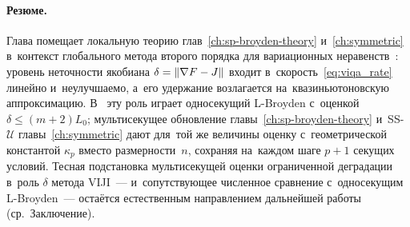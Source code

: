 \paragraph{Резюме.}\label{par:viqa-summary}
Глава помещает локальную теорию глав~\ref{ch:sp-broyden-theory}
и~\ref{ch:symmetric} в~контекст глобального метода второго порядка для
вариационных неравенств~\cite{viqa2024}: уровень неточности якобиана
$\delta=\left\|\nabla F - J\right\|$ входит в~скорость~\eqref{eq:viqa_rate}
линейно и~неулучшаемо, а~его удержание возлагается на~квазиньютоновскую
аппроксимацию. В~\cite{viqa2024} эту роль играет односекущий L-Broyden
с~оценкой $\delta\le(m{+}2)L_0$; мультисекущее обновление
главы~\ref{ch:sp-broyden-theory} и~SS-$\mathcal{U}$ главы~\ref{ch:symmetric}
дают для~той же величины оценку с~геометрической константой $\kappa_p$
вместо размерности~$n$, сохраняя на~каждом шаге $p{+}1$ секущих условий.
Тесная подстановка мультисекущей оценки ограниченной деградации в~роль
$\delta$ метода VIJI~--- и~сопутствующее численное сравнение с~односекущим
L-Broyden~--- остаётся естественным направлением дальнейшей работы
(ср.~Заключение).
